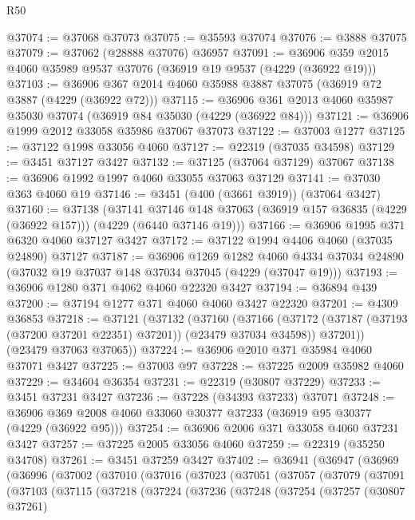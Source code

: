 \begin{lexlean}{R50}
\begin{coremodule}
@37074 := @37068 @37073
@37075 := @35593 @37074
@37076 := @3888 @37075
@37079 := @37062 (@28888 @37076) @36957
@37091 := @36906 @359 @2015 @4060 @35989 @9537 @37076 (@36919 @19 @9537 (@4229 (@36922 @19)))
@37103 := @36906 @367 @2014 @4060 @35988 @3887 @37075 (@36919 @72 @3887 (@4229 (@36922 @72)))
@37115 := @36906 @361 @2013 @4060 @35987 @35030 @37074 (@36919 @84 @35030 (@4229 (@36922 @84)))
@37121 := @36906 @1999 @2012 @33058 @35986 @37067 @37073
@37122 := @37003 @1277
@37125 := @37122 @1998 @33056 @4060
@37127 := @22319 (@37035 @34598)
@37129 := @3451 @37127 @3427
@37132 := @37125 (@37064 @37129) @37067
@37138 := @36906 @1992 @1997 @4060 @33055 @37063 @37129
@37141 := @37030 @363 @4060 @19
@37146 := @3451 (@400 (@3661 @3919)) (@37064 @3427)
@37160 := @37138
    (@37141
      @37146
      @148
      @37063
      (@36919 @157 @36835 (@4229 (@36922 @157)))
      (@4229 (@6440 @37146 @19)))
@37166 := @36906 @1995 @371 @6320 @4060 @37127 @3427
@37172 := @37122 @1994 @4406 @4060 (@37035 @24890) @37127
@37187 := @36906
    @1269
    @1282
    @4060
    @4334
    @37034
    @24890
    (@37032 @19 @37037 @148 @37034 @37045 (@4229 (@37047 @19)))
@37193 := @36906 @1280 @371 @4062 @4060 @22320 @3427
@37194 := @36894 @439
@37200 := @37194 @1277 @371 @4060 @4060 @3427 @22320
@37201 := @4309 @36853
@37218 := @37121
    (@37132
      (@37160
        (@37166
          (@37172 (@37187 (@37193 (@37200 @37201 @22351) @37201)) (@23479 @37034 @34598))
          @37201))
      (@23479 @37063 @37065))
@37224 := @36906 @2010 @371 @35984 @4060 @37071 @3427
@37225 := @37003 @97
@37228 := @37225 @2009 @35982 @4060
@37229 := @34604 @36354
@37231 := @22319 (@30807 @37229)
@37233 := @3451 @37231 @3427
@37236 := @37228 (@34393 @37233) @37071
@37248 := @36906 @369 @2008 @4060 @33060 @30377 @37233 (@36919 @95 @30377 (@4229 (@36922 @95)))
@37254 := @36906 @2006 @371 @33058 @4060 @37231 @3427
@37257 := @37225 @2005 @33056 @4060
@37259 := @22319 (@35250 @34708)
@37261 := @3451 @37259 @3427
@37402 := @36941
    (@36947
      (@36969
        (@36996
          (@37002
            (@37010
              (@37016
                (@37023
                  (@37051
                    (@37057
                      (@37079
                        (@37091
                          (@37103
                            (@37115
                              (@37218
                                (@37224
                                  (@37236
                                    (@37248
                                      (@37254
                                        (@37257
                                          (@30807 @37261)

\end{coremodule}
\end{lexlean}
